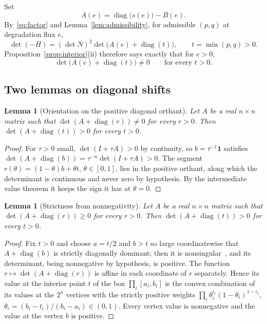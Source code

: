 \documentclass[11pt,a4paper]{article}
\theoremstyle{plain}
\newtheorem{lemma}[theorem]{Lemma}
\theoremstyle{definition}
\theoremstyle{remark}
\numberwithin{equation}{section}
\newcommand{\one}{\mathbf{1}}
\newcommand{\diag}{\operatorname{diag}}
\begin{document}
Set
\begin{equation}\label{eq:A}
A(e)=\diag\bigl(s(e)\bigr)-B(e).
\end{equation}
By~\eqref{eq:factor} and Lemma~\ref{lem:admissibility}, for admissible $(p,q)$ at degradation flux $e$,
\begin{equation}\label{eq:detH}
\det(-H)=(\det N)^2\det\bigl(A(e)+\diag(t)\bigr),\qquad t=\min(p,q)>0 .
\end{equation}
Proposition~\ref{prop:interior}(ii) therefore says exactly that for $e>0$,
\begin{equation}\label{eq:interiorA}
\det\bigl(A(e)+\diag(t)\bigr)\neq0\qquad\text{for every }t>0 .
\end{equation}

\subsection{Two lemmas on diagonal shifts}

\begin{lemma}[Orientation on the positive diagonal orthant]\label{lem:orientation}
Let $A$ be a real $n\times n$ matrix such that $\det(A+\diag(r))\neq0$ for every $r>0$. Then $\det(A+\diag(t))>0$ for every $t>0$.
\end{lemma}

\begin{proof}
For $\tau>0$ small, $\det(I+\tau A)>0$ by continuity, so $b=\tau^{-1}\one$ satisfies $\det(A+\diag(b))=\tau^{-n}\det(I+\tau A)>0$. The segment $r(\theta)=(1-\theta)b+\theta t$, $\theta\in[0,1]$, lies in the positive orthant, along which the determinant is continuous and never zero by hypothesis. By the intermediate value theorem it keeps the sign it has at $\theta=0$.
\end{proof}

\begin{lemma}[Strictness from nonnegativity]\label{lem:strict}
Let $A$ be a real $n\times n$ matrix such that $\det(A+\diag(r))\ge0$ for every $r>0$. Then $\det(A+\diag(t))>0$ for every $t>0$.
\end{lemma}

\begin{proof}
Fix $t>0$ and choose $a=t/2$ and $b>t$ so large coordinatewise that $A+\diag(b)$ is strictly diagonally dominant; then it is nonsingular~\cite[Theorem~6.1.10]{HJ13}, and its determinant, being nonnegative by hypothesis, is positive. The function $r\mapsto\det(A+\diag(r))$ is affine in each coordinate of $r$ separately. Hence its value at the interior point $t$ of the box $\prod_i[a_i,b_i]$ is the convex combination of its values at the $2^n$ vertices with the strictly positive weights $\prod_i\theta_i^{\epsilon_i}(1-\theta_i)^{1-\epsilon_i}$, $\theta_i=(b_i-t_i)/(b_i-a_i)\in(0,1)$. Every vertex value is nonnegative and the value at the vertex $b$ is positive.
\end{proof}
\end{document}
